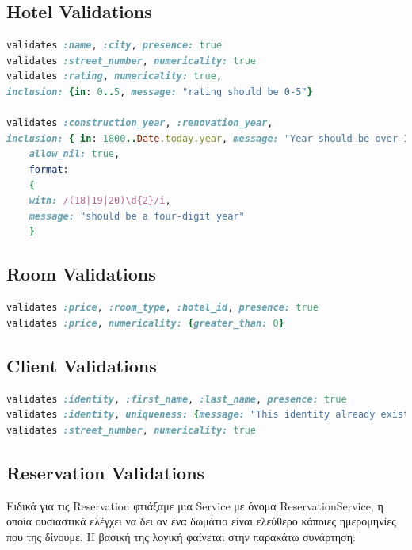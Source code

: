 \documentclass[a4paper,12pt]{article}
\begin{document}
\subsection{Hotel Validations}
	\begin{lstlisting}[language=Ruby]
validates :name, :city, presence: true
validates :street_number, numericality: true
validates :rating, numericality: true, 
inclusion: {in: 0..5, message: "rating should be 0-5"}

validates :construction_year, :renovation_year,
inclusion: { in: 1800..Date.today.year, message: "Year should be over 1800"},
 	allow_nil: true,
 	format: 
 	{ 
   	with: /(18|19|20)\d{2}/i, 
   	message: "should be a four-digit year"
 	}
	\end{lstlisting}

\subsection{Room Validations}
	\begin{lstlisting}[language=Ruby]
validates :price, :room_type, :hotel_id, presence: true
validates :price, numericality: {greater_than: 0}
	\end{lstlisting}
	
\subsection{Client Validations}
	\begin{lstlisting}[language=Ruby]
validates :identity, :first_name, :last_name, presence: true
validates :identity, uniqueness: {message: "This identity already exists. Identity must be unique!"}
validates :street_number, numericality: true
	\end{lstlisting}
	
\subsection{Reservation Validations}
	Ειδικά για τις Reservation φτιάξαμε μια Service με όνομα ReservationService, η οποία ουσιαστικά ελέγχει να δει αν ένα δωμάτιο είναι ελεύθερο κάποιες ημερομηνίες που της δίνουμε. Η βασική της λογική φαίνεται στην παρακάτω συνάρτηση:
	
\end{document}
